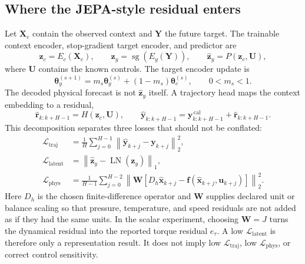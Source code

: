 \documentclass[10pt,journal]{IEEEtran}
\begin{document}
\subsection{Where the JEPA-style residual enters}
Let $\mathbf{X}_c$ contain the observed context and $\mathbf{Y}$ the future target. The trainable context encoder, stop-gradient target encoder, and predictor are
\begin{equation}
  \mathbf{z}_c=E_c(\mathbf{X}_c),
  \qquad
  \mathbf{z}_y=\operatorname{sg}\!\left(E_y(\mathbf{Y})\right),
  \qquad
  \widehat{\mathbf{z}}_y=P(\mathbf{z}_c,\mathbf{U}),
  \label{eq:app_jepa_branches}
\end{equation}
where $\mathbf{U}$ contains the known controls. The target encoder update is
\begin{equation}
  \boldsymbol{\theta}_y^{(s+1)}=m_s\boldsymbol{\theta}_y^{(s)}
  +(1-m_s)\boldsymbol{\theta}_c^{(s)},
  \qquad 0<m_s<1.
  \label{eq:app_ema}
\end{equation}
The decoded physical forecast is not $\widehat{\mathbf{z}}_y$ itself. A trajectory head maps the context embedding to a residual,
\begin{equation}
  \widehat{\mathbf{r}}_{k:k+H-1}=H(\mathbf{z}_c,\mathbf{U}),
  \qquad
  \widehat{\mathbf{y}}_{k:k+H-1}
  =\mathbf{y}^{\,\mathrm{cal}}_{k:k+H-1}+\widehat{\mathbf{r}}_{k:k+H-1}.
  \label{eq:app_residual_forecast}
\end{equation}
This decomposition separates three losses that should not be conflated:
\begin{equation}
  \begin{aligned}
  \mathcal{L}_{\mathrm{traj}}&=\frac{1}{H}\sum_{j=0}^{H-1}
  \left\|\widehat{\mathbf{y}}_{k+j}-\mathbf{y}_{k+j}\right\|_2^2,\\
  \mathcal{L}_{\mathrm{latent}}&=\left\|\widehat{\mathbf{z}}_y-\operatorname{LN}(\mathbf{z}_y)\right\|_1,\\
  \mathcal{L}_{\mathrm{phys}}&=\frac{1}{H-1}\sum_{j=0}^{H-2}
  \left\|\mathbf{W}\left[D_h\widehat{\mathbf{x}}_{k+j}-\mathbf{f}(\widehat{\mathbf{x}}_{k+j},\mathbf{u}_{k+j})\right]\right\|_2^2.
  \end{aligned}
  \label{eq:app_three_losses}
\end{equation}
Here $D_h$ is the chosen finite-difference operator and $\mathbf{W}$ supplies declared unit or balance scaling so that pressure, temperature, and speed residuals are not added as if they had the same units. In the scalar experiment, choosing $\mathbf{W}=J$ turns the dynamical residual into the reported torque residual $e_\tau$. A low $\mathcal{L}_{\mathrm{latent}}$ is therefore only a representation result. It does not imply low $\mathcal{L}_{\mathrm{traj}}$, low $\mathcal{L}_{\mathrm{phys}}$, or correct control sensitivity.
\end{document}
